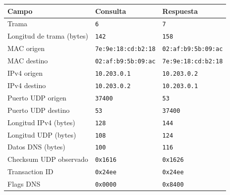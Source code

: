 \begin{tabularx}{\textwidth}{Xll}
\toprule
Campo & Consulta & Respuesta \\
\midrule
Trama & \texttt{6} & \texttt{7} \\
Longitud de trama (bytes) & \texttt{142} & \texttt{158} \\
MAC origen & \texttt{7e:9e:18:cd:b2:18} & \texttt{02:af:b9:5b:09:ac} \\
MAC destino & \texttt{02:af:b9:5b:09:ac} & \texttt{7e:9e:18:cd:b2:18} \\
IPv4 origen & \texttt{10.203.0.1} & \texttt{10.203.0.2} \\
IPv4 destino & \texttt{10.203.0.2} & \texttt{10.203.0.1} \\
Puerto UDP origen & \texttt{37400} & \texttt{53} \\
Puerto UDP destino & \texttt{53} & \texttt{37400} \\
Longitud IPv4 (bytes) & \texttt{128} & \texttt{144} \\
Longitud UDP (bytes) & \texttt{108} & \texttt{124} \\
Datos DNS (bytes) & \texttt{100} & \texttt{116} \\
Checksum UDP observado & \texttt{0x1616} & \texttt{0x1626} \\
Transaction ID & \texttt{0x24ee} & \texttt{0x24ee} \\
Flags DNS & \texttt{0x0000} & \texttt{0x8400} \\
\bottomrule
\end{tabularx}
